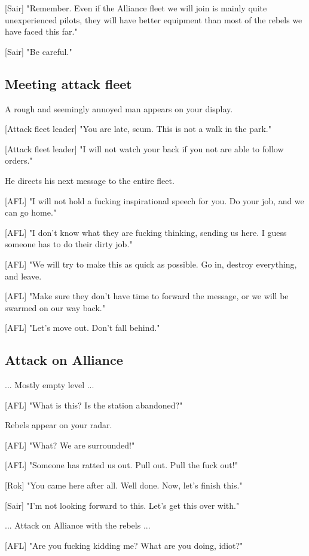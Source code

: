 \documentclass[a4paper,12pt]{article}
\begin{document}
[Sair] "Remember. Even if the Alliance fleet we will join is mainly quite
unexperienced pilots, they will have better equipment than most of the rebels
we have faced this far."

[Sair] "Be careful."

\subsection{Meeting attack fleet}

A rough and seemingly annoyed man appears on your display.

[Attack fleet leader] "You are late, scum. This is not a walk in the park."

[Attack fleet leader] "I will not watch your back if you not are able to follow orders."

He directs his next message to the entire fleet.

[AFL] "I will not hold a fucking inspirational speech for you. Do your job,
and we can go home." 

[AFL] "I don't know what they are fucking thinking, sending us here. I guess someone has to do their dirty job."

[AFL] "We will try to make this as quick as possible. Go in, destroy everything,
and leave.

[AFL] "Make sure they don't have time to forward the message, or we will be swarmed on our way back."

[AFL] "Let's move out. Don't fall behind."

\subsection{Attack on Alliance}

... Mostly empty level ...

[AFL] "What is this? Is the station abandoned?"

Rebels appear on your radar.

[AFL] "What? We are surrounded!" 

[AFL] "Someone has ratted us out. Pull out. Pull the fuck out!"

[Rok] "You came here after all. Well done. Now, let's finish this."

[Sair] "I'm not looking forward to this. Let's get this over with."

... Attack on Alliance with the rebels ...

[AFL] "Are you fucking kidding me? What are you doing, idiot?"
\end{document}
